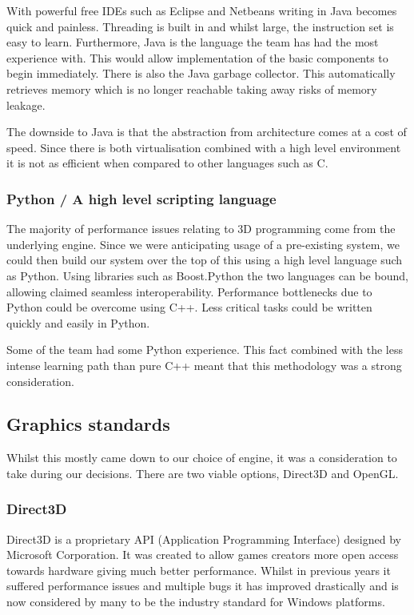 With powerful free IDEs such as Eclipse and Netbeans
writing in Java becomes quick and painless. Threading is built in
and whilst large, the instruction set is easy to learn. Furthermore, 
Java is the language the team has had the most experience with. This
would allow implementation of the basic components to begin immediately.
There is also the Java garbage collector. This automatically retrieves
memory which is no longer reachable taking away risks of memory leakage.

The downside to Java is that the abstraction from architecture comes at
a cost of speed. Since there is both virtualisation combined with
a high level environment it is not as efficient when compared to other languages such as C\cite{Jelovic}. 


\subsubsection{Python / A high level scripting language}

The majority of performance issues relating to 3D programming come
from the underlying engine. Since we were anticipating usage of a
pre-existing system, we could then build our system over the top of
this using a high level language such as Python. Using libraries such
as Boost.Python\cite{boostPython} the two languages can be bound,
allowing claimed seamless interoperability. Performance bottlenecks
due to Python could be overcome using C++. Less critical tasks could
be written quickly and easily in Python.

Some of the team had some Python experience. This fact combined with the less intense learning
path than pure C++ meant that this methodology was a strong consideration.


\subsection{Graphics standards}

Whilst this mostly came down to our choice of engine, it was a consideration
to take during our decisions. There are two viable options, Direct3D
and OpenGL.


\subsubsection{Direct3D}

Direct3D is a proprietary API (Application Programming Interface) designed
by Microsoft Corporation. It was created to allow games creators more
open access towards hardware giving much better performance. Whilst
in previous years it suffered performance issues and multiple bugs
it has improved drastically and is now considered by many to be the
industry standard for Windows platforms\cite{Roy2002}.


